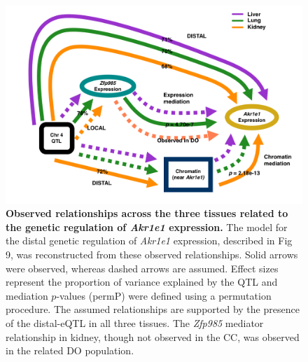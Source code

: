 \documentclass[10pt,letterpaper,twoside]{article}
\begin{document}
\begin{figure}[hp]
\renewcommand{\familydefault}{\sfdefault}\normalfont
\centering
\includegraphics[width=\textwidth, trim={0in 0in 0in 0in}, clip]{figs/akr1e1_observed_relationships.png}
\caption{\textbf{Observed relationships across the three tissues related to the genetic regulation of \textit{Akr1e1} expression.} 
The model for the distal genetic regulation of \textit{Akr1e1} expression, described in Fig 9, was reconstructed from these observed relationships. Solid arrows were observed, whereas dashed arrows are assumed. Effect sizes represent the proportion of variance explained by the QTL and mediation $p$-values (permP) were defined using a permutation procedure. The assumed relationships are supported by the presence of the distal-eQTL in all three tissues. The \textit{Zfp985} mediator relationship in kidney, though not observed in the CC, was observed in the related DO population.
\label{fig:akr1e1_relationships}}
\end{figure}

\clearpage
\end{document}

